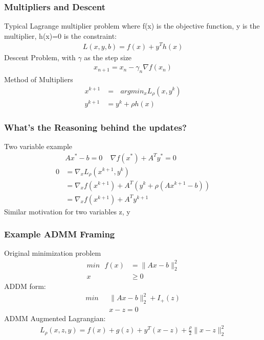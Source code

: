 \documentclass{beamer}
\begin{document}
\begin{frame}
  \frametitle{Multipliers and Descent}
  Typical Lagrange multiplier problem where f(x) is the objective function, y is the multiplier, h(x)=0 is the constraint:
  \begin{align}
    L(x,y,b) = f(x) + y^{T}h(x)
    \label{}
  \end{align}
  Descent Problem, with $\gamma$ as the step size
  \begin{align}
    x_{n+1} = x_{n} - \gamma_{n}\nabla f(x_{n})
  \end{align}
Method of Multipliers
\begin{align}
  x^{k+1} &= \: \: \: argmin_{x} L_{\rho}(x,y^{k}) \\
  y^{k+1} &= y^{k} + \rho h(x)
\end{align}

\end{frame}

\begin{frame}
  \frametitle{What's the Reasoning behind the updates?}
  Two variable example
  \begin{align}
   &Ax^{*} - b = 0 \: \: \: \: \: \nabla f(x^{*}) + A^{T}y^{*} = 0 \\
   0 &= \nabla_{x} L_{\rho} (x^{k+1},y^{k}) \\
   &= \nabla_{x} f(x^{k+1}) + A^{T}(y^{k} + \rho (Ax^{k+1} - b)) \\
   &= \nabla_{x} f(x^{k+1}) + A^{T} y^{k+1}
  \end{align}
  Similar motivation for two variables z, y
\end{frame}

\begin{frame}
  \frametitle{Example ADMM Framing}
  Original minimization problem
  \begin{align}
    min \: \: \: f(x) &= \|Ax-b\|_{2}^{2} \\
    x & \geq 0
  \end{align}
  ADDM form:
  \begin{align}
   min \: \: \: &\|Ax-b\|_{2}^{2} + I_{+}(z) \\
    & x-z = 0
  \end{align}
  ADMM Augmented Lagrangian:
  \begin{align}
    L_{\rho}(x,z,y) =f(x) +  g(z) + y^{T}(x-z) + \frac{\rho}{2}\|x-z\|_{2}^{2} 
  \end{align}
\end{frame}
\end{document}
